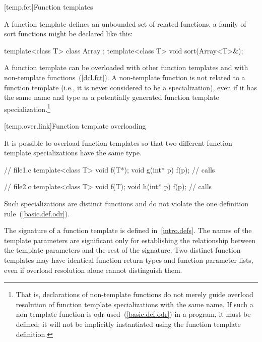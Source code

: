[temp.fct]{Function templates}

\pnum
A function template defines an unbounded set of related functions.
\enterexample
a family of sort functions might be declared like this:

\begin{codeblock}
template<class T> class Array { };
template<class T> void sort(Array<T>&);
\end{codeblock}
\exitexample

\pnum
A function template can be overloaded with other function templates
and with non-template functions~(\ref{dcl.fct}).
A non-template function is not
related to a function template
(i.e., it is never considered to be a specialization),
even if it has the same name and type
as a potentially generated function template specialization.\footnote{That is,
declarations of non-template functions do not merely guide
overload resolution of
function template specializations
with the same name.
If such a non-template function is odr-used~(\ref{basic.def.odr}) in a program, it must be defined;
it will not be implicitly instantiated using the function template definition.}

[temp.over.link]{Function template overloading}

\pnum
{}%
It is possible to overload function templates so that two different
function template specializations have the same type.
\enterexample

\begin{minipage}{.45\hsize}
\begin{codeblock}
// file1.c
template<class T>
  void f(T*);
void g(int* p) {
  f(p); // calls 
}
\end{codeblock}
\end{minipage}
\begin{minipage}{.45\hsize}
\begin{codeblock}
// file2.c
template<class T>
  void f(T);
void h(int* p) {
  f(p); // calls 
}
\end{codeblock}
\end{minipage}

\exitexample

\pnum
Such specializations are distinct functions and do not violate the one
definition rule~(\ref{basic.def.odr}).

\pnum
The signature of a function template
is defined in~\ref{intro.defs}.
The names of the template parameters are significant only for establishing
the relationship between the template parameters and the rest of the
signature.
\enternote
Two distinct function templates may have identical function return types and
function parameter lists, even if overload resolution alone cannot distinguish
them.

